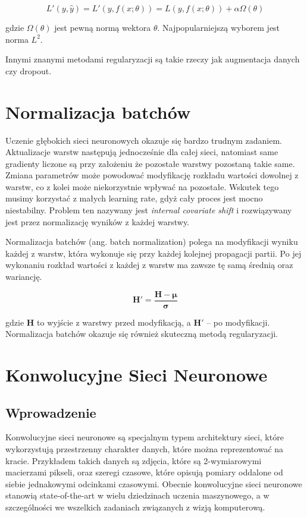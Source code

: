 \documentclass[licencjacka]{pracamgr}
\begin{document}
$$ L'(y, \hat{y}) = L'(y, f(x; \theta)) = L(y, f(x; \theta)) + \alpha \Omega(\theta) $$

gdzie $ \Omega(\theta) $ jest pewną normą wektora $ \theta $. Najpopularniejszą wyborem jest norma $ L^2 $.

Innymi znanymi metodami regularyzacji są takie rzeczy jak augmentacja danych czy dropout.

\section{Normalizacja batchów}

Uczenie głębokich sieci neuronowych okazuje się bardzo trudnym zadaniem. Aktualizacje warstw następują jednocześnie dla całej sieci, natomiast same gradienty liczone są przy założeniu że pozostałe warstwy pozostaną takie same. Zmiana parametrów może powodować modyfikację rozkładu wartości dowolnej z warstw, co z kolei może niekorzystnie wpływać na pozostałe. Wskutek tego musimy korzystać z małych learning rate, gdyż cały proces jest mocno niestabilny. Problem ten nazywany jest \emph{internal covariate shift} i rozwiązywany jest przez normalizację wyników z każdej warstwy. 

Normalizacja batchów (ang. batch normalization) \cite{batch-norm} polega na modyfikacji wyniku każdej z warstw, która wykonuje się przy każdej kolejnej propagacji partii. Po jej wykonaniu rozkład wartości z każdej z warstw ma zawsze tę samą średnią oraz wariancję.

$$ \mathbf{H'} = \frac{\mathbf{H} - \mathbf{\mu}}{\mathbf{\sigma}} $$

gdzie $ \mathbf{H} $ to wyjście z warstwy przed modyfikacją, a $ \mathbf{H'} $ -- po modyfikacji. Normalizacja batchów okazuje się również skuteczną metodą regularyzacji.

\section{Konwolucyjne Sieci Neuronowe}

\subsection{Wprowadzenie}

Konwolucyjne sieci neuronowe \cite{lecun-cnn, krizhevsky-cnn} są specjalnym typem architektury sieci, które wykorzystują przestrzenny charakter danych, które można reprezentować na kracie. Przykładem takich danych są zdjęcia, które są 2-wymiarowymi macierzami pikseli, oraz szeregi czasowe, które opisują pomiary oddalone od siebie jednakowymi odcinkami czasowymi. Obecnie konwolucyjne sieci neuronowe stanowią state-of-the-art w wielu dziedzinach uczenia maszynowego, a w szczególności we wszelkich zadaniach związanych z wizją komputerową. 
\end{document}
